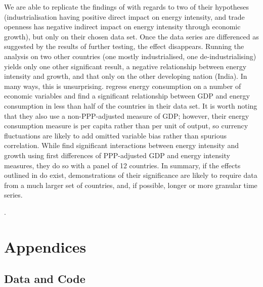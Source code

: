 \documentclass[11pt,a4paper]{article}
\begin{document}
We are able to replicate the findings of \cite{panHowIndustrializationTrade2019} with regards to two of their hypotheses (industrialisation having positive direct impact on energy intensity, and trade openness has negative indirect impact on energy intensity through economic growth), but only on their chosen data set.
Once the data series are differenced as suggested by the results of further testing, the effect disappears. 
Running the analysis on two other countries (one mostly industrialised, one de-industrialising) yields only one other significant result, a negative relationship between energy intensity and growth, and that only on the other developing nation (India).
In many ways, this is unsurprising.
\cite{tibaIncomeTradeOpenness2018} regress energy consumption on a number of economic variables and find a significant relationship between GDP and energy consumption in less than half of the countries in their data set. 
It is worth noting that they also use a non-PPP-adjusted measure of GDP; however, their energy consumption measure is per capita rather than per unit of output, so currency fluctuations are likely to add omitted variable bias rather than spurious correlation.
While \cite{aydinDoesLevelEnergy2018} find significant interactions between energy intensity and growth using first differences of PPP-adjusted GDP and energy intensity measures, they do so with a panel of 12 countries.
In summary, if the effects outlined in  \cite{panHowIndustrializationTrade2019} do exist, demonstrations of their significance are likely to require data from a much larger set of countries, and, if possible, longer or more granular time series.

\clearpage

\appendix

\renewcommand{\refname}{\section{References}}.


\clearpage

\section{Appendices}

\subsection{Data and Code}\label{sec:data_and_code}
\end{document}
